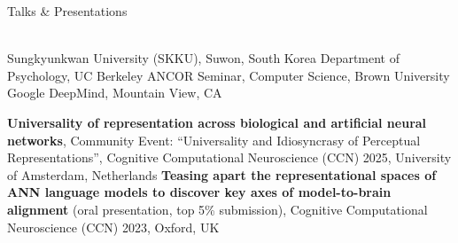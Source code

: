 %

\begin{rubric}{Talks \& Presentations}

\\
\entry*[Feb 2026] Sungkyunkwan University (SKKU), Suwon, South Korea
\entry*[Apr 2025] Department of Psychology, UC Berkeley
\entry*[Dec 2024] ANCOR Seminar, Computer Science, Brown University
\entry*[Sep 2024] Google DeepMind, Mountain View, CA

\entry*[Aug 2025] \textbf{Universality of representation across biological and artificial neural networks}, Community Event: ``Universality and Idiosyncrasy of Perceptual Representations'', Cognitive Computational Neuroscience (CCN) 2025, University of Amsterdam, Netherlands
\entry*[Aug 2023] \textbf{Teasing apart the representational spaces of ANN language models to discover key axes of model-to-brain alignment} (oral presentation, top 5\% submission), Cognitive Computational Neuroscience (CCN) 2023, Oxford, UK

\end{rubric}
